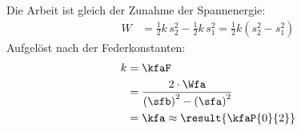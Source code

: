 Die Arbeit ist gleich der Zunahme der Spannenergie:
\begin{align}
 W &= \frac{1}{2}k\,s_2^2-\frac{1}{2}k\,s_1^2 = \frac{1}{2}k\left(s_2^2-s_1^2\right)
\end{align}
Aufgelöst nach der Federkonstanten:
\begin{align}
 k &= \kfaF \\
   &= \frac{2\cdot\Wfa}{\left(\sfb\right)^2-\left(\sfa\right)^2} \\
   &= \kfa \approx \result{\kfaP{0}{2}}
\end{align}
